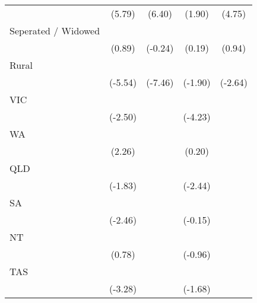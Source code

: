 {\begin{tabular}{l*{4}{c}}
                    &      (5.79)         &      (6.40)         &      (1.90)         &      (4.75)         \\
[1em]
Seperated / Widowed &                     &                     &                     &                     \\
                    &      (0.89)         &     (-0.24)         &      (0.19)         &      (0.94)         \\
[1em]
Rural               &            \sym{***}&            \sym{***}&                     &            \sym{**} \\
                    &     (-5.54)         &     (-7.46)         &     (-1.90)         &     (-2.64)         \\
[1em]
VIC                 &            \sym{*}  &                     &            \sym{***}&                     \\
                    &     (-2.50)         &                     &     (-4.23)         &                     \\
[1em]
WA                  &            \sym{*}  &                     &                     &                     \\
                    &      (2.26)         &                     &      (0.20)         &                     \\
[1em]
QLD                 &                     &                     &            \sym{*}  &                     \\
                    &     (-1.83)         &                     &     (-2.44)         &                     \\
[1em]
SA                  &            \sym{*}  &                     &                     &                     \\
                    &     (-2.46)         &                     &     (-0.15)         &                     \\
[1em]
NT                  &                     &                     &                     &                     \\
                    &      (0.78)         &                     &     (-0.96)         &                     \\
[1em]
TAS                 &            \sym{**} &                     &                     &                     \\
                    &     (-3.28)         &                     &     (-1.68)         &                     \\

\end{tabular}}

